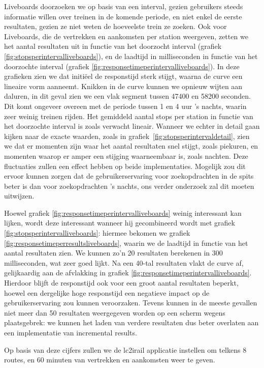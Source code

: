 Liveboards doorzoeken we op basis van een interval, gezien gebruikers steeds informatie willen over treinen in de komende periode, en niet enkel de eerste resultaten, gezien ze niet weten de hoeveelste trein ze zoeken. Ook voor Liveboards, die de vertrekken en aankomsten per station weergeven, zetten we het aantal resultaten uit in functie van het doorzocht interval (grafiek \ref{fig:stopsperintervalliveboards}), en de laadtijd in milliseconden in functie van het doorzochte interval (grafiek \ref{fig:responsetimeperintervalliveboards}). In deze grafieken zien we dat initiëel de responstijd sterk stijgt, waarna de curve een lineaire vorm aanneemt. Knikken in de curve kunnen we opnieuw wijten aan daluren, in dit geval zien we een vlak segment tussen 47400 en 58200 seconden. Dit komt ongeveer overeen met de periode tussen 1 en 4 uur 's nachts, waarin zeer weinig treinen rijden. Het gemiddeld aantal stops per station in functie van het doorzochte interval is zoals verwacht lineair. Wanneer we echter in detail gaan kijken naar de exacte waarden, zoals in grafiek~\ref{fig:stopsperintervaldetail}, zien we dat er momenten zijn waar het aantal resultaten snel stijgt, zoals piekuren, en momenten waarop er amper een stijging waarneembaar is, zoals nachten. Deze fluctuaties zullen een effect hebben op beide implementaties. Mogelijk zou dit ervoor kunnen zorgen dat de gebruikerservaring voor zoekopdrachten in de spits beter is dan voor zoekopdrachten 's nachts, ons verder onderzoek zal dit moeten uitwijzen.

Hoewel grafiek  \ref{fig:responsetimeperintervalliveboards} weinig interessant kan lijken, wordt deze interessant wanneer hij gecombineerd wordt met grafiek \ref{fig:stopsperintervalliveboards}: hiermee bekomen we grafiek \ref{fig:responsetimeperresultsliveboards}, waarin we de laadtijd in functie van het aantal resultaten zien. We kunnen zo'n 20 resultaten berekenen in 300 milliseconden, wat zeer goed lijkt. Na een 40-tal resultaten vlakt de curve af, gelijkaardig aan de afvlakking in grafiek \ref{fig:responsetimeperintervalliveboards}. Hierdoor blijft de responstijd ook voor een groot aantal resultaten beperkt, hoewel een dergelijke hoge responstijd een negatieve impact op de gebruikerservaring zou kunnen veroorzaken. Tevens kunnen in de meeste gevallen niet meer dan 50 resultaten weergegeven worden op een scherm wegens plaatsgebrek: we kunnen het laden van verdere resultaten dus beter overlaten aan een implementatie van incremental results.

Op basis van deze cijfers zullen we de lc2irail applicatie instellen om telkens 8 routes, en 60 minuten van vertrekken en aankomsten weer te geven.

